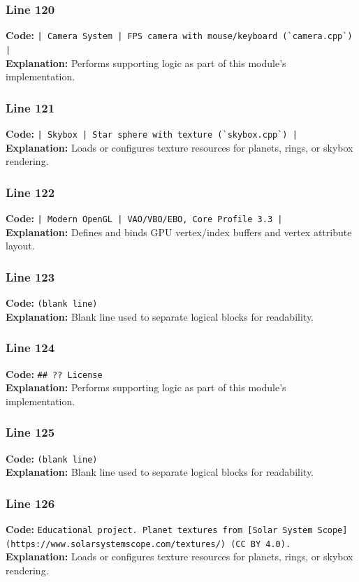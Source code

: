 \documentclass[11pt,a4paper]{article}
\begin{document}
\subsubsection*{Line 120}
\textbf{Code:} \verb!| Camera System | FPS camera with mouse/keyboard (`camera.cpp`) |!\\
\textbf{Explanation:} Performs supporting logic as part of this module's implementation.

\subsubsection*{Line 121}
\textbf{Code:} \verb!| Skybox | Star sphere with texture (`skybox.cpp`) |!\\
\textbf{Explanation:} Loads or configures texture resources for planets, rings, or skybox rendering.

\subsubsection*{Line 122}
\textbf{Code:} \verb!| Modern OpenGL | VAO/VBO/EBO, Core Profile 3.3 |!\\
\textbf{Explanation:} Defines and binds GPU vertex/index buffers and vertex attribute layout.

\subsubsection*{Line 123}
\textbf{Code:} \texttt{(blank line)}\\
\textbf{Explanation:} Blank line used to separate logical blocks for readability.

\subsubsection*{Line 124}
\textbf{Code:} \verb|## ?? License|\\
\textbf{Explanation:} Performs supporting logic as part of this module's implementation.

\subsubsection*{Line 125}
\textbf{Code:} \texttt{(blank line)}\\
\textbf{Explanation:} Blank line used to separate logical blocks for readability.

\subsubsection*{Line 126}
\textbf{Code:} \verb|Educational project. Planet textures from [Solar System Scope](https://www.solarsystemscope.com/textures/) (CC BY 4.0).|\\
\textbf{Explanation:} Loads or configures texture resources for planets, rings, or skybox rendering.
\end{document}
